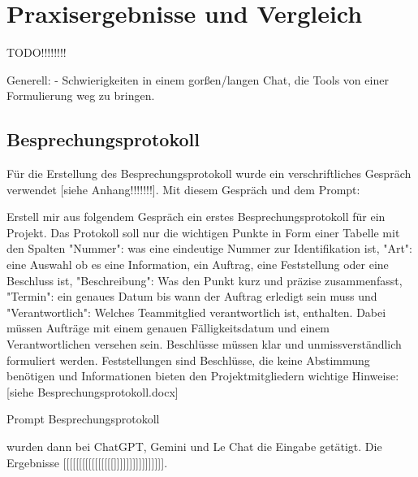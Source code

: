 
\chapter{Praxisergebnisse und Vergleich} 

TODO!!!!!!!!

Generell:
    - Schwierigkeiten in einem gorßen/langen Chat, die Tools von einer Formulierung weg zu bringen. 

\section{Besprechungsprotokoll}  \label{CompBesprechungsprotokoll}

Für die Erstellung des Besprechungsprotokoll wurde ein verschriftliches Gespräch verwendet [siehe Anhang!!!!!!!]. Mit 
diesem Gespräch und dem Prompt:
    
\begin{prompt}[H]
    \begin{tcolorbox}[colback=gray!20, colframe=gray!20, boxrule=0pt, sharp corners] 
        Erstell mir aus folgendem Gespräch ein erstes Besprechungsprotokoll für ein Projekt. Das Protokoll soll nur 
        die wichtigen Punkte in Form einer Tabelle mit den Spalten "Nummer": was eine eindeutige Nummer zur 
        Identifikation ist, "Art": eine Auswahl ob es eine Information, ein Auftrag, eine Feststellung oder eine 
        Beschluss ist, "Beschreibung": Was den Punkt kurz und präzise zusammenfasst, "Termin": ein genaues Datum bis 
        wann der Auftrag erledigt sein muss und "Verantwortlich": Welches Teammitglied verantwortlich ist, enthalten. 
        Dabei müssen Aufträge mit einem genauen Fälligkeitsdatum und einem Verantwortlichen versehen sein. Beschlüsse 
        müssen klar und unmissverständlich formuliert werden. Feststellungen sind Beschlüsse, die keine Abstimmung 
        benötigen und Informationen bieten den Projektmitgliedern wichtige Hinweise: 
        [siehe Besprechungsprotokoll.docx]
        \vfill
    \end{tcolorbox}
    \caption{Prompt Besprechungsprotokoll}
    \label{Prompt Besprechungsprotokoll}
\end{prompt}

wurden dann bei ChatGPT, Gemini und Le Chat die Eingabe getätigt. Die Ergebnisse [[[[[[[[[[[[[[[[]]]]]]]]]]]]]]]].\\

